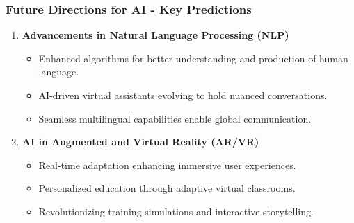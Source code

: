 \documentclass{beamer}
\begin{document}
\begin{frame}[fragile]
    \frametitle{Future Directions for AI - Key Predictions}
    \begin{enumerate}
        \item \textbf{Advancements in Natural Language Processing (NLP)}
            \begin{itemize}
                \item Enhanced algorithms for better understanding and production of human language.
                \item AI-driven virtual assistants evolving to hold nuanced conversations.
                \item Seamless multilingual capabilities enable global communication.
            \end{itemize}

        \item \textbf{AI in Augmented and Virtual Reality (AR/VR)}
            \begin{itemize}
                \item Real-time adaptation enhancing immersive user experiences.
                \item Personalized education through adaptive virtual classrooms.
                \item Revolutionizing training simulations and interactive storytelling.
            \end{itemize}
    \end{enumerate}
\end{frame}
\end{document}
